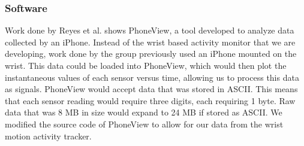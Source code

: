 \subsubsection{Software}
\label{Sec:Software}
Work done by Reyes et al. \cite{concha2014study} shows PhoneView,
a tool developed to analyze data collected by an iPhone.
Instead of the wrist based activity monitor that we are developing,
work done by the group previously used an iPhone mounted on the wrist.
This data could be loaded into PhoneView,
which would then plot the instantaneous values of each sensor versus time,
allowing us to process this data as signals.
PhoneView would accept data that was stored in ASCII.
This means that each sensor reading would require three digits,
each requiring 1 byte.
Raw data that was 8 MB in size would expand to 24 MB if stored as ASCII.
We modified the source code of PhoneView to allow for our data from the wrist motion activity tracker.

